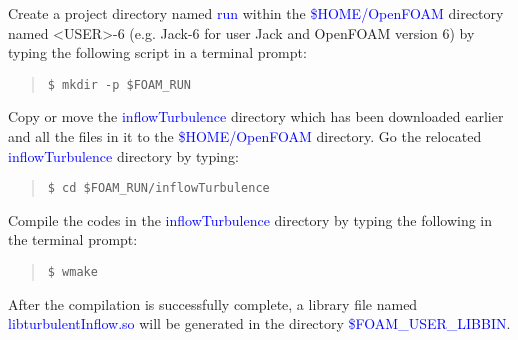 Create a project directory named \textcolor{blue}{run} within the \textcolor{blue}{\$HOME/OpenFOAM} directory named \textless{USER}\textgreater{-6} (e.g. Jack-6 for user Jack and OpenFOAM version 6) by typing the following script in a terminal prompt:

\begin{quote}
\begin{verbatim}
$ mkdir -p $FOAM_RUN
\end{verbatim}
\end{quote}

Copy or move the \textcolor{blue}{inflowTurbulence} directory which has been downloaded earlier and all the files in it to the \textcolor{blue}{\$HOME/OpenFOAM} directory. Go the relocated \textcolor{blue}{inflowTurbulence} directory by typing:

\begin{quote}
\begin{verbatim}
$ cd $FOAM_RUN/inflowTurbulence
\end{verbatim}
\end{quote}

Compile the codes in the \textcolor{blue}{inflowTurbulence} directory by typing the following in the terminal prompt:

\begin{quote}
\begin{verbatim}
$ wmake
\end{verbatim}
\end{quote}

After the compilation is successfully complete, a library file named \textcolor{blue}{libturbulentInflow.so} will be generated in the directory \textcolor{blue}{\$FOAM\_USER\_LIBBIN}.
